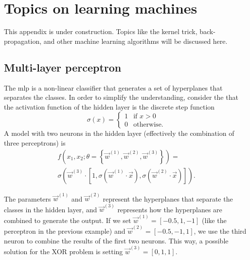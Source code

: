 \chapter{Topics on learning machines}
\label{chap:learning-machines}
\glsresetall



This appendix is under construction.  Topics like the kernel trick, back-propagation, and
other machine learning algorithms will be discussed here.

{}
\clearpage

\section{Multi-layer perceptron}

The \gls{mlp} is a non-linear classifier that generates a set of hyperplanes
that separates the classes.  In order to simplify the understanding, consider the
that the activation function of the hidden layer is the discrete step function
\begin{equation*}
  \sigma(x) = \begin{cases}
    1 & \text{if } x > 0 \\
    0 & \text{otherwise.}
  \end{cases}
\end{equation*}
A model with two neurons in the hidden layer (effectively the combination of three
perceptrons) is
\begin{multline*}
  f(x_1, x_2; \theta = \left\{ \vec{w}^{(1)}, \vec{w}^{(2)}, \vec{w}^{(3)} \right\}) = \\
  \sigma\left(
    \vec{w}^{(3)} \cdot \left[1, \sigma(\vec{w}^{(1)} \cdot \vec{x}), \sigma(\vec{w}^{(2)} \cdot \vec{x})\right]
  \right)\text{.}
\end{multline*}

The parameters $\vec{w}^{(1)}$ and $\vec{w}^{(2)}$ represent the hyperplanes that separate
the classes in the hidden layer, and $\vec{w}^{(3)}$ represents how the hyperplanes are
combined to generate the output.  If we set $\vec{w}^{(1)} = [-0.5, 1, -1]$ (like the
perceptron in the previous example) and $\vec{w}^{(2)} = [-0.5, -1, 1]$, we use the third neuron
to combine the results of the first two neurons.  This way, a possible solution for the
XOR problem is setting $\vec{w}^{(3)} = [0, 1, 1]$.


